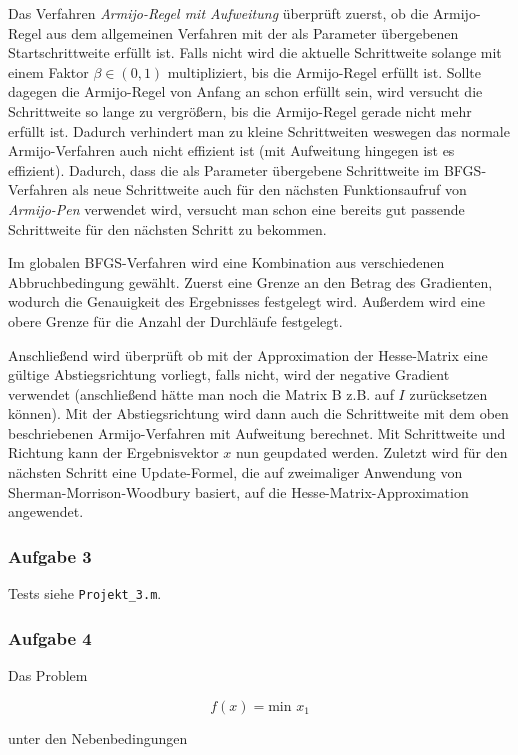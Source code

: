 \documentclass[a4paper, 12pt]{report}
\begin{document}
Das Verfahren \textit{Armijo-Regel mit Aufweitung} überprüft zuerst, ob die Armijo-Regel aus dem allgemeinen Verfahren mit der als
Parameter übergebenen Startschrittweite erfüllt ist. Falls nicht wird die aktuelle Schrittweite solange mit einem Faktor $\beta \in (0, 1)$
multipliziert, bis die Armijo-Regel erfüllt ist. Sollte dagegen die Armijo-Regel von Anfang an schon erfüllt sein, wird versucht die
Schrittweite so lange zu vergrößern, bis die Armijo-Regel gerade nicht mehr erfüllt ist. Dadurch verhindert man zu kleine Schrittweiten
weswegen das normale Armijo-Verfahren auch nicht effizient ist (mit Aufweitung hingegen ist es effizient). Dadurch, dass die als
Parameter übergebene Schrittweite im BFGS-Verfahren als neue Schrittweite auch für den nächsten Funktionsaufruf von \textit{Armijo-Pen}
verwendet wird, versucht man schon eine bereits gut passende Schrittweite für den nächsten Schritt zu bekommen.\par
Im globalen BFGS-Verfahren wird eine Kombination aus verschiedenen Abbruchbedingung gewählt. Zuerst eine Grenze an den Betrag des Gradienten,
wodurch die Genauigkeit des Ergebnisses festgelegt wird. Außerdem wird eine obere Grenze für die Anzahl der Durchläufe festgelegt.\par
Anschließend wird überprüft ob mit der Approximation der Hesse-Matrix eine gültige Abstiegsrichtung vorliegt, falls nicht, wird der
negative Gradient verwendet (anschließend hätte man noch die Matrix B z.B. auf $I$ zurücksetzen können). Mit der Abstiegsrichtung
wird dann auch die Schrittweite mit dem oben beschriebenen Armijo-Verfahren mit Aufweitung berechnet. Mit Schrittweite und Richtung
kann der Ergebnisvektor $x$ nun geupdated werden. Zuletzt wird für den nächsten Schritt eine Update-Formel, die auf zweimaliger Anwendung
von Sherman-Morrison-Woodbury basiert, auf die Hesse-Matrix-Approximation angewendet.

\subsubsection{Aufgabe 3}
Tests siehe \lstinline[basicstyle=\ttfamily\color{black}]|Projekt_3.m|.

\subsubsection{Aufgabe 4}

Das Problem

$$f(x) = \text{min } x_1$$

unter den Nebenbedingungen
\end{document}
